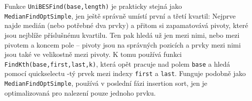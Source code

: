         Funkce {\tt UniBESFind(base,length)} je prakticky stejná jako {\tt MedianFindOptSimple}, jen ještě správně umístí první a třetí kvartil: Nejprve najde medián (nebo potřebné dva prvky) a přitom si zapamatovává pivoty, které jsou nejblíže příslušnému kvartilu. Ten pak hledá už jen mezi nimi, nebo mezi pivotem a koncem pole -- pivoty jsou na správných pozicích a prvky mezi nimi jsou také ve velikostně mezi pivoty. K tomu používá funkci {\tt FindKth(base,first,last,k)}, která opět pracuje nad polem {\tt base} a hledá pomocí quickselectu \kk-tý prvek mezi indexy {\tt first} a {\tt last}. Funguje podobně jako {\tt MedianFindOptSimple}, používá v poslední fázi insertion sort, jen je optimalizovaná pro nalezení pouze jednoho prvku.
























